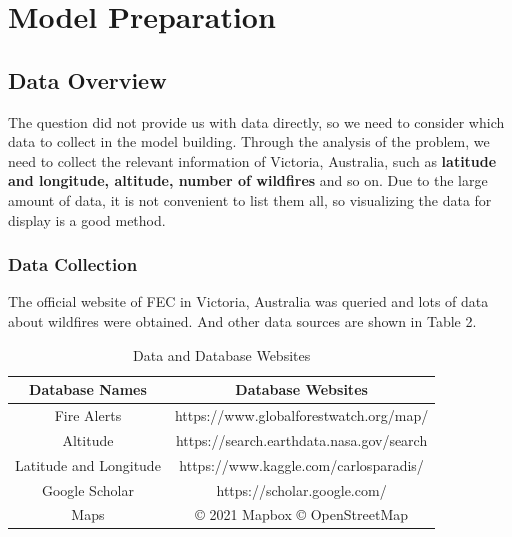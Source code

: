 \documentclass[12pt]{article}  %
\begin{document}
\section{Model Preparation}
\subsection{Data Overview}
The question did not provide us with data directly, so we need to consider which data to collect in the model building. Through the analysis of the problem, we need to collect the relevant information of Victoria, Australia, such as \textbf{latitude and longitude, altitude, number of wildfires} and so on. Due to the large amount of data, it is not convenient to list them all, so visualizing the data for display is a good method.

\subsubsection{Data Collection}
The official website of FEC in Victoria, Australia was queried and lots of data about wildfires were obtained. And other data sources are shown in Table 2.

\begin{table}[htbp]
    \begin{center}
        \caption{Data and Database Websites}
        \resizebox{\textwidth}{!}
        {\begin{tabular}{c c}
                \toprule[2pt]
                \multicolumn{1}{m{5cm}}{\centering \textbf{Database Names}}
                                       & \multicolumn{1}{m{10cm}}{\centering \textbf{Database Websites} } \\ %
                \midrule
                Fire Alerts            & https://www.globalforestwatch.org/map/                           \\
                Altitude               & https://search.earthdata.nasa.gov/search                         \\
                Latitude and Longitude & https://www.kaggle.com/carlosparadis/                            \\
                Google Scholar         & https://scholar.google.com/                                      \\
                Maps                   & \copyright{} 2021 Mapbox \copyright{} OpenStreetMap              \\
                \bottomrule[2pt]
            \end{tabular}}
    \end{center}
\end{table}
\end{document}
